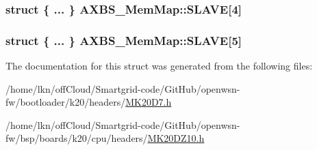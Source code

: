 \subsubsection[{\texorpdfstring{S\+L\+A\+VE}{SLAVE}}]{\setlength{\rightskip}{0pt plus 5cm}struct \{ ... \}   A\+X\+B\+S\+\_\+\+Mem\+Map\+::\+S\+L\+A\+VE\mbox{[}4\mbox{]}}\hypertarget{struct_a_x_b_s___mem_map_a09a930ae27c168079dfaa520d093b9ff}{}\label{struct_a_x_b_s___mem_map_a09a930ae27c168079dfaa520d093b9ff}
\subsubsection[{\texorpdfstring{S\+L\+A\+VE}{SLAVE}}]{\setlength{\rightskip}{0pt plus 5cm}struct \{ ... \}   A\+X\+B\+S\+\_\+\+Mem\+Map\+::\+S\+L\+A\+VE\mbox{[}5\mbox{]}}\hypertarget{struct_a_x_b_s___mem_map_ab7a97c697372d87a7a5299a2f3084425}{}\label{struct_a_x_b_s___mem_map_ab7a97c697372d87a7a5299a2f3084425}


The documentation for this struct was generated from the following files\+:\begin{DoxyCompactItemize}
\item 
/home/lkn/off\+Cloud/\+Smartgrid-\/code/\+Git\+Hub/openwsn-\/fw/bootloader/k20/headers/\hyperlink{bootloader_2k20_2headers_2_m_k20_d7_8h}{M\+K20\+D7.\+h}\item 
/home/lkn/off\+Cloud/\+Smartgrid-\/code/\+Git\+Hub/openwsn-\/fw/bsp/boards/k20/cpu/headers/\hyperlink{_m_k20_d_z10_8h}{M\+K20\+D\+Z10.\+h}\end{DoxyCompactItemize}
